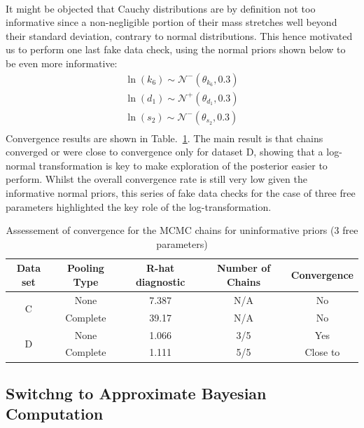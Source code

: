 \documentclass[11pt]{article}
\begin{document}
\\[12pt]
It might be objected that Cauchy distributions are by definition not too informative since a non-negligible portion of their mass stretches well beyond their standard deviation, contrary to normal distributions. This hence motivated us to perform one last fake data check, using the normal priors shown below to be even more informative: 
\begin{align*}
    \ln(k_6) \sim \mathcal{N}^-(\theta_{k_6}, 0.3) \\ 
    \ln(d_1) \sim \mathcal{N}^+(\theta_{d_1}, 0.3) \\ 
    \ln(s_2) \sim \mathcal{N}^-(\theta_{s_2}, 0.3) \\ 
\end{align*}
Convergence results are shown in Table.~\ref{tbl:rhat_4}. The main result is that chains converged or were close to convergence only for dataset D, showing that a log-normal transformation is key to make exploration of the posterior easier to perform. Whilst the overall convergence rate is still very low given the informative normal priors, this series of fake data checks for the case of three free parameters highlighted the key role of the log-transformation.

\begin{table}[!h]
    \centering
    \caption{Assessement of convergence for the MCMC chains for uninformative priors (3 free parameters)}
    \begin{tabular}{c|c||c|c|c}
        \hline
        Data set & Pooling Type & R-hat diagnostic & Number of Chains & Convergence  \\ \hline 
        \multirow{2}{*}{C}      & None     & 7.387 & N/A & No \\
                                & Complete & 39.17 & N/A & No \\ \hline 
        \multirow{2}{*}{D}      & None     & 1.066 & 3/5 & Yes \\
                                & Complete & 1.111 & 5/5 & Close to \\ \hline 
    \end{tabular}
    \label{tbl:rhat_4}
\end{table}
\subsection{Switchng to Approximate Bayesian Computation}

\newpage 
\clearpage
\newpage



\end{document}
